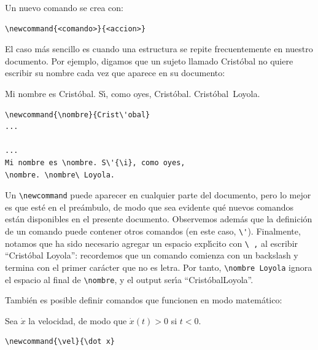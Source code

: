 {Un nuevo comando se crea con:
\begin{verbatim}
\newcommand{<comando>}{<accion>}
\end{verbatim}

El caso m\'as sencillo es cuando una estructura se repite
frecuentemente en nuestro documento. Por ejemplo, digamos que un
sujeto llamado Crist\'obal no quiere escribir su nombre cada vez que
aparece en su documento:

\vspace{.3cm}
{\small
\begin{minipage}[t]{5cm}
\newcommand{\nombre}{Crist\'obal}
Mi nombre es \nombre. S\'{\i}, como oyes, \nombre. \nombre\ Loyola. 
\end{minipage}
\hspace{1.5cm}
\begin{minipage}[t]{5cm}
\begin{verbatim}
\newcommand{\nombre}{Crist\'obal}
...

...
Mi nombre es \nombre. S\'{\i}, como oyes, 
\nombre. \nombre\ Loyola. 
\end{verbatim}
\end{minipage}
}
\vspace{.3cm}

Un \verb+\newcommand+ puede aparecer en cualquier parte del
documento, pero lo mejor es que est\'e en el pre\'ambulo, de modo que
sea evidente qu\'e nuevos comandos est\'an disponibles en el presente
documento. Observemos adem\'as que la definici\'on de un comando puede
contener otros comandos (en este caso, \verb+\'+). Finalmente, notamos
que ha sido necesario agregar un espacio expl\'{\i}cito con \verb+\ ,+
al escribir ``Crist\'obal Loyola'': recordemos que un comando comienza
con un backslash y termina con el primer car\'acter que no es
letra. Por tanto, \verb+\nombre Loyola+ ignora el espacio al final de
\verb+\nombre+, y el output ser\'{\i}a ``Crist\'obalLoyola''. 

Tambi\'en es posible definir comandos que funcionen en modo matem\'atico:

\vspace{.3cm}
{\small
\begin{minipage}[t]{5cm}
\newcommand{\vel}{\dot x}

Sea $\vel$ la velocidad, de modo que $\vel(t)> 0$ si $t<0$. 
\end{minipage}
\hspace{1.5cm}
\begin{minipage}[t]{5cm}
\begin{verbatim}
\newcommand{\vel}{\dot x}


\end{verbatim}
\end{minipage}}}
